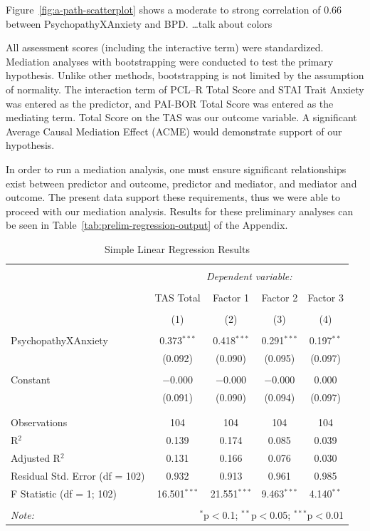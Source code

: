 \documentclass[
  man,floatsintext]{apa7}
\begin{document}
Figure~\ref{fig:a-path-scatterplot} shows a moderate to strong correlation of 0.66 between PsychopathyXAnxiety and BPD. \ldots talk about colors

All assessment scores (including the interactive term) were standardized. Mediation analyses with bootstrapping were conducted to test the primary hypothesis. Unlike other methods, bootstrapping is not limited by the assumption of normality. The interaction term of PCL--R Total Score and STAI Trait Anxiety was entered as the predictor, and PAI-BOR Total Score was entered as the mediating term. Total Score on the TAS was our outcome variable. A significant Average Causal Mediation Effect (ACME) would demonstrate support of our hypothesis.

In order to run a mediation analysis, one must ensure significant relationships exist between predictor and outcome, predictor and mediator, and mediator and outcome. The present data support these requirements, thus we were able to proceed with our mediation analysis. Results for these preliminary analyses can be seen in Table~\ref{tab:prelim-regression-output} of the Appendix.

\begin{table}[!htbp] \centering 
  \caption{Simple Linear Regression Results} 
  \label{tab:simple-regression-output} 
\begin{tabular}{@{\extracolsep{1pt}}lcccc} 
\\[-1.8ex]\hline 
\hline \\[-1.8ex] 
 & \multicolumn{4}{c}{\textit{Dependent variable:}} \\ 
\cline{2-5} 
\\[-1.8ex] & TAS Total & Factor 1 & Factor 2 & Factor 3 \\ 
\\[-1.8ex] & (1) & (2) & (3) & (4)\\ 
\hline \\[-1.8ex] 
 PsychopathyXAnxiety & 0.373$^{***}$ & 0.418$^{***}$ & 0.291$^{***}$ & 0.197$^{**}$ \\ 
  & (0.092) & (0.090) & (0.095) & (0.097) \\ 
  & & & & \\ 
 Constant & $-$0.000 & $-$0.000 & $-$0.000 & 0.000 \\ 
  & (0.091) & (0.090) & (0.094) & (0.097) \\ 
  & & & & \\ 
\hline \\[-1.8ex] 
Observations & 104 & 104 & 104 & 104 \\ 
R$^{2}$ & 0.139 & 0.174 & 0.085 & 0.039 \\ 
Adjusted R$^{2}$ & 0.131 & 0.166 & 0.076 & 0.030 \\ 
Residual Std. Error (df = 102) & 0.932 & 0.913 & 0.961 & 0.985 \\ 
F Statistic (df = 1; 102) & 16.501$^{***}$ & 21.551$^{***}$ & 9.463$^{***}$ & 4.140$^{**}$ \\ 
\hline 
\hline \\[-1.8ex] 
\textit{Note:}  & \multicolumn{4}{r}{$^{*}$p$<$0.1; $^{**}$p$<$0.05; $^{***}$p$<$0.01} \\ 
\end{tabular} 
\end{table}
\end{document}
